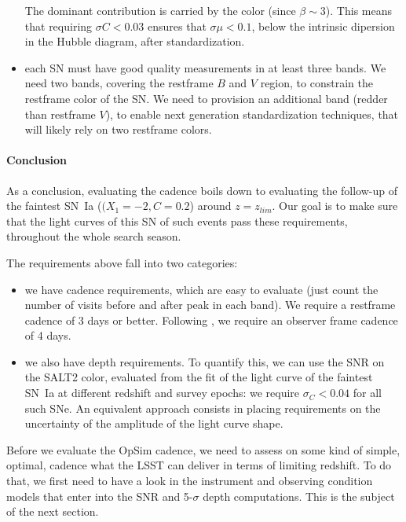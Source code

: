 \documentclass[\docopts]{\docclass}
\begin{document}
\begin{itemize}
  The dominant contribution is carried by the color (since
  $\beta \sim 3$). This means that requiring $\sigma C < 0.03$ ensures
  that $\sigma \mu < 0.1$, below the intrinsic dipersion in the Hubble
  diagram, after standardization.

\item each SN must have good quality measurements in at least three
  bands. We need two bands, covering the restframe $B$ and $V$ region,
  to constrain the restframe color of the SN. We need to provision an
  additional band (redder than restframe $V$), to enable next
  generation standardization techniques, that will likely rely on two
  restframe colors.
\end{itemize}


\paragraph{Conclusion} As a conclusion, evaluating the cadence boils
down to evaluating the follow-up of the faintest SN~Ia ($(X_1=-2,
C=0.2$) around $z = z_{lim}$. Our goal is to make sure that the light
curves of this SN of such events pass these requirements, throughout
the whole search season.

The requirements above fall into two categories: 
\begin{itemize}
\item we have  cadence requirements, which are easy  to evaluate (just
  count the number of visits before  and after peak in each band).  We
  require  a  restframe  cadence  of  3  days  or  better.   Following
  \cite{2014A&A...572A..80A}, we require an  observer frame cadence of
  4 days.

\item we also have depth requirements.  To quantify this, we can use
  the SNR on the SALT2 color, evaluated from the fit of the light
  curve of the faintest SN~Ia at different redshift and survey epochs:
  we require $\sigma_C < 0.04$ for all such SNe.  An equivalent
  approach consists in placing requirements on the uncertainty of the
  amplitude of the light curve shape.  
\end{itemize}


Before we evaluate the OpSim cadence, we need to assess on some kind
of simple, optimal, cadence what the LSST can deliver in terms of
limiting redshift. To do that, we first need to have a look in the
instrument and observing condition models that enter into the SNR and
5-$\sigma$ depth computations. This is the subject of the next
section.
\end{document}
